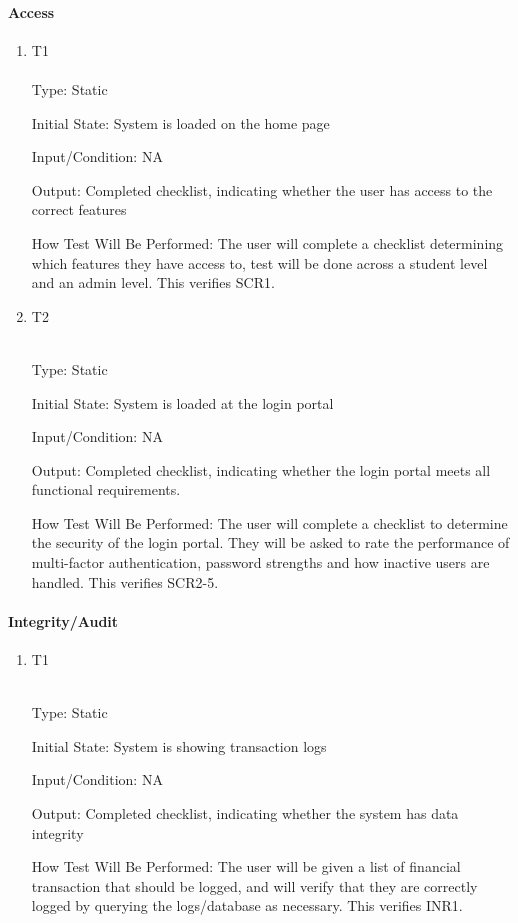 \documentclass[12pt, titlepage]{article}
\begin{document}
\paragraph{Access}
\begin{enumerate}
\item {T1\\}\\
\hypertarget{NFR15.1-TC1}{}
Type: Static

Initial State: System is loaded on the home page

Input/Condition: NA

Output: Completed checklist, indicating whether the user has access to the correct features

How Test Will Be Performed: The user will complete a checklist determining which features they have access to, test will be done across a student level and an admin level. This verifies SCR1.

\item {T2\\}\\
\hypertarget{NFR15.1-TC2}{}

Type: Static

Initial State: System is loaded at the login portal

Input/Condition: NA

Output: Completed checklist, indicating whether the login portal meets all functional requirements.

How Test Will Be Performed: The user will complete a checklist to determine the security of the login portal. They will be asked to rate the performance of multi-factor authentication, password strengths and how inactive users are handled. This verifies SCR2-5.
\end{enumerate}
\paragraph{Integrity/Audit}
\begin{enumerate}
\item {T1\\}\\
\hypertarget{NFR15.2-TC1}{}

Type: Static

Initial State: System is showing transaction logs

Input/Condition: NA

Output: Completed checklist, indicating whether the system has data integrity

How Test Will Be Performed: The user will be given a list of financial transaction that should be logged, and will verify that they are correctly logged by querying the logs/database as necessary. This verifies INR1.
\end{enumerate}
\end{document}
